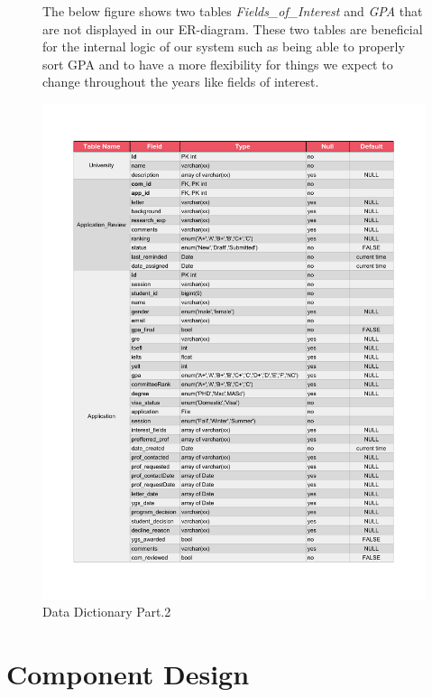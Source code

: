 \documentclass[fontsize=12pt,paper=letter,twoside]{scrartcl}
\begin{document}
\begin{figure}[!htb]
The below figure shows two tables \emph{Fields\_of\_Interest} and \emph{GPA} that are not displayed in our ER-diagram. These two tables are beneficial for the internal logic of our system such as being able to properly sort GPA and to have a more flexibility for things we expect to change throughout the years like fields of interest.
\begin{center}
\includegraphics[width=\textwidth, page=2]{images/data_dictionary.pdf}
\end{center}
\caption{Data Dictionary Part.2}
\label{fig:dd2}
\end{figure}


\clearpage
\newpage
\section{Component Design}
\end{document}
